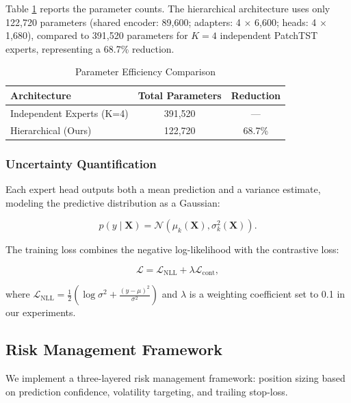 \documentclass[review]{elsarticle}
\begin{document}
Table \ref{tab:params} reports the parameter counts. The hierarchical architecture uses only 122,720 parameters (shared encoder: 89,600; adapters: 4 $\times$ 6,600; heads: 4 $\times$ 1,680), compared to 391,520 parameters for $K=4$ independent PatchTST experts, representing a 68.7\% reduction.

\begin{table}[t]
\centering
\caption{Parameter Efficiency Comparison}
\label{tab:params}
\begin{tabular}{lcc}
\toprule
Architecture & Total Parameters & Reduction \\
\midrule
Independent Experts (K=4) & 391,520 & --- \\
Hierarchical (Ours) & 122,720 & 68.7\% \\
\bottomrule
\end{tabular}
\end{table}

\subsubsection{Uncertainty Quantification}

Each expert head outputs both a mean prediction and a variance estimate, modeling the predictive distribution as a Gaussian:

\begin{equation}
p(y \mid \mathbf{X}) = \mathcal{N}(\mu_k(\mathbf{X}), \sigma^2_k(\mathbf{X})).
\end{equation}

The training loss combines the negative log-likelihood with the contrastive loss:

\begin{equation}
\mathcal{L} = \mathcal{L}_{\text{NLL}} + \lambda \mathcal{L}_{\text{cont}},
\end{equation}

where $\mathcal{L}_{\text{NLL}} = \frac{1}{2} \left( \log \sigma^2 + \frac{(y - \mu)^2}{\sigma^2} \right)$ and $\lambda$ is a weighting coefficient set to 0.1 in our experiments.

\subsection{Risk Management Framework}

We implement a three-layered risk management framework: position sizing based on prediction confidence, volatility targeting, and trailing stop-loss.
\end{document}
